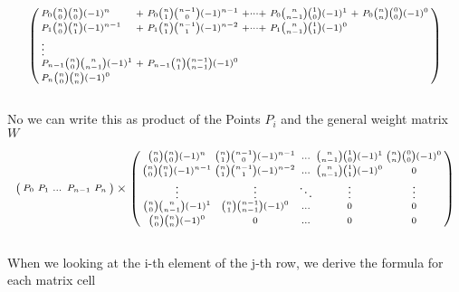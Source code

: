 \begin{equation*}
    \begin{psmallmatrix*}[l]
        P_0     {n \choose 0}{n \choose 0}  (-1)^{n}   &+& P_0     {n \choose 1}{n-1 \choose 0}(-1)^{n-1} &+ \dots + & P_0 {n \choose n-1}{1 \choose 0}(-1)^{1} &+& P_0 {n \choose n}{0 \choose 0}(-1)^{0} \\
        P_1     {n \choose 0}{n \choose 1}  (-1)^{n-1} &+& P_1     {n \choose 1}{n-1 \choose 1}(-1)^{n-2} &+ \dots + & P_1 {n \choose n-1}{1 \choose 1}(-1)^{0}                                            \\
        \vdots                                                                                                                                                                                             \\
        P_{n-1} {n \choose 0}{n \choose n-1}(-1)^{1}   &+& P_{n-1} {n \choose 1}{n-1 \choose n-1}(-1)^{0}                                                                                                  \\
        P_{n}   {n \choose 0}{n \choose n}  (-1)^{0}
    \end{psmallmatrix*}
\end{equation*}
\\
No we can write this as product of the Points $P_i$ and the general weight matrix $W$

\begin{equation*}
    \begin{psmallmatrix*}
        P_0 & P_1 & \dots & P_{n-1} & P_{n}
    \end{psmallmatrix*}
    \times
    \begin{psmallmatrix*}
        {n \choose 0}{n \choose 0}(-1)^{n}   & {n \choose 1}{n-1 \choose 0}(-1)^{n-1}  & \hdots & {n \choose n-1}{1 \choose 0}(-1)^{1} & {n \choose n}{0 \choose 0}(-1)^{0} \\
        {n \choose 0}{n \choose 1}(-1)^{n-1} & {n \choose 1}{n-1 \choose 1}(-1)^{n-2}  & \hdots & {n \choose n-1}{1 \choose 1}(-1)^{0} & 0                                  \\
        \vdots                               & \vdots                                  & \ddots & \vdots                               & \vdots                             \\
        {n \choose 0}{n \choose n-1}(-1)^{1} & {n \choose 1}{n-1 \choose n-1}(-1)^{0}  & \hdots & 0                                    & 0                                  \\
        {n \choose 0}{n \choose n}(-1)^{0}   & 0                                       & \hdots & 0                                    & 0
    \end{psmallmatrix*}
\end{equation*}
\\
When we looking at the i-th element of the j-th row, we derive the formula for each matrix cell


